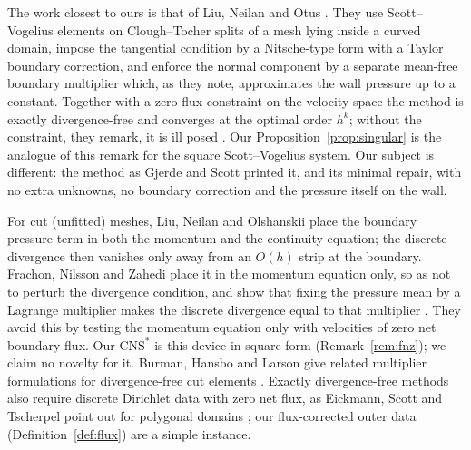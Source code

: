 \documentclass[pdflatex,sn-mathphys-num]{sn-jnl}
\theoremstyle{thmstyleone}
\theoremstyle{thmstylethree}
\newcommand{\CNS}{\mathrm{CNS}^\ast}
\begin{document}
The work closest to ours is that of Liu, Neilan and Otus \cite{LiuNeilanOtus2023}. They use Scott--Vogelius elements on Clough--Tocher splits of a mesh lying inside a curved domain, impose the tangential condition by a Nitsche-type form with a Taylor boundary correction, and enforce the normal component by a separate mean-free boundary multiplier which, as they note, approximates the wall pressure up to a constant. Together with a zero-flux constraint on the velocity space the method is exactly divergence-free and converges at the optimal order $h^k$; without the constraint, they remark, it is ill posed \cite[Remark~3.2]{LiuNeilanOtus2023}. Our Proposition~\ref{prop:singular} is the analogue of this remark for the square Scott--Vogelius system. Our subject is different: the method as Gjerde and Scott printed it, and its minimal repair, with no extra unknowns, no boundary correction and the pressure itself on the wall.

For cut (unfitted) meshes, Liu, Neilan and Olshanskii \cite{LiuNeilanOlshanskii2023} place the boundary pressure term in both the momentum and the continuity equation; the discrete divergence then vanishes only away from an $O(h)$ strip at the boundary. Frachon, Nilsson and Zahedi \cite{FrachonNilssonZahedi2024} place it in the momentum equation only, so as not to perturb the divergence condition, and show that fixing the pressure mean by a Lagrange multiplier makes the discrete divergence equal to that multiplier \cite[(5.7)--(5.9)]{FrachonNilssonZahedi2024}. They avoid this by testing the momentum equation only with velocities of zero net boundary flux. Our $\CNS$ is this device in square form (Remark~\ref{rem:fnz}); we claim no novelty for it. Burman, Hansbo and Larson give related multiplier formulations for divergence-free cut elements \cite{BurmanHansboLarson2024}. Exactly divergence-free methods also require discrete Dirichlet data with zero net flux, as Eickmann, Scott and Tscherpel point out for polygonal domains \cite{EickmannScottTscherpel2025}; our flux-corrected outer data (Definition~\ref{def:flux}) are a simple instance.
\end{document}
